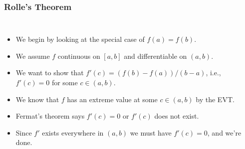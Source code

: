\documentclass[serif,ignorenonframetext]{beamer}
\begin{document}
\begin{frame}
  \frametitle{Rolle's Theorem}
  \begin{columns}
  \begin{itemize}[<+->]
  \item We begin by looking at the special case of $f(a)=f(b)$.
  \item We assume $f$ continuous on $[a,b]$ and differentiable on $(a,b)$.
  \item We want to show that $f'(c)=(f(b)-f(a))/(b-a)$, i.e., $f'(c)=0$
    for some $c\in(a,b)$.
  \item We know that $f$ has an extreme value at some $c\in(a,b)$ by the EVT.
  \item Fermat's theorem says $f'(c)=0$ or $f'(c)$ does not exist.
  \item Since $f'$ exists everywhere in $(a,b)$ we must have $f'(c)=0$,
    and we're done.
  \end{itemize}

\end{columns}
\end{frame}
\end{document}
